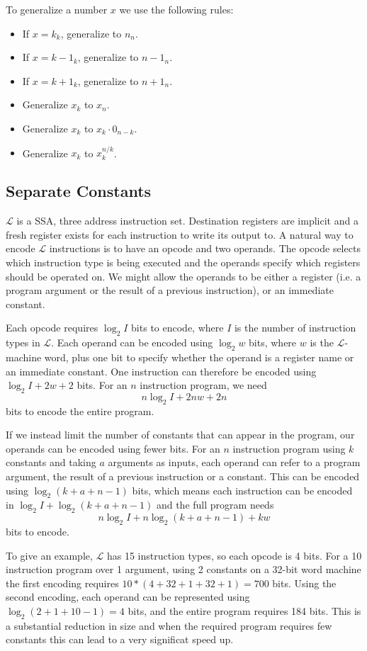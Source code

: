 \documentclass[a4paper]{llncs}
\begin{document}
To generalize a number $x$ we use the following rules:

\begin{itemize}
 \item If $x = k_k$, generalize to $n_n$.
 \item If $x = k-1_k$, generalize to $n-1_n$.
 \item If $x = k+1_k$, generalize to $n+1_n$.
 \item Generalize $x_k$ to $x_n$.
 \item Generalize $x_k$ to $x_k \cdot 0_{n-k}$.
 \item Generalize $x_k$ to $x_k^{n / k}$.
\end{itemize}


\subsection{Separate Constants}
$\mathcal{L}$ is a SSA, three address instruction set.  Destination registers
are implicit and a fresh register exists for each instruction to write its
output to.  A natural way to encode $\mathcal{L}$ instructions is to have an
opcode and two operands.  The opcode selects which instruction type is being
executed and the operands specify which registers should be operated on.
We might allow the operands to be either a register (i.e. a program argument
or the result of a previous instruction), or an immediate constant.

Each opcode requires $\log_2 I$ bits to encode, where $I$ is the number
of instruction types in $\mathcal{L}$.  Each operand can be encoded using
$\log_2 w$ bits, where $w$ is the $\mathcal{L}$-machine word, plus one
bit to specify whether the operand is a register name or an immediate constant.
One instruction can therefore be encoded using $\log_2 I + 2w + 2$ bits.
For an $n$ instruction program, we need $$n \log_2 I + 2nw + 2n$$ bits to encode
the entire program.

If we instead limit the number of constants that can appear in the program,
our operands can be encoded using fewer bits.  For an $n$ instruction program
using $k$ constants and taking $a$ arguments as inputs, each operand can refer
to a program argument, the result of a previous instruction or a constant.
This can be encoded using $\log_2 (k+a+n-1)$ bits, which means each instruction
can be encoded in $\log_2 I + \log_2 (k + a + n - 1)$ and the full program
needs $$n \log_2 I + n \log_2 (k + a + n - 1) + kw$$ bits to encode.

To give an example, $\mathcal{L}$ has 15 instruction types, so each opcode is 4 bits.
For a 10 instruction program over 1 argument, using 2 constants on a 32-bit word
machine the first encoding requires $10 * (4 + 32 + 1 + 32 + 1) = 700$ bits.
Using the second encoding, each operand can be represented using
$\log_2 (2 + 1 + 10 - 1) = 4$ bits, and the entire program requires 184 bits.
This is a substantial reduction in size and when the required program requires
few constants this can lead to a very significat speed up.
\end{document}
